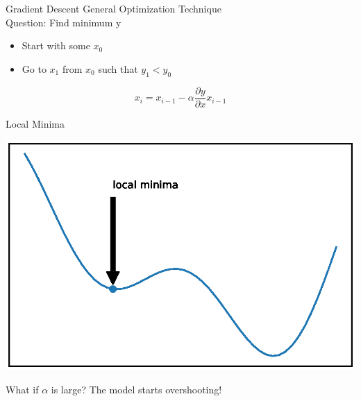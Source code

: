 \documentclass{beamer}
\begin{document}
\begin{frame}{Gradient Descent}
    General Optimization Technique\\
    Question: Find minimum y
    \begin{itemize}
        \item Start with some $x_{0}$
        \item Go to $x_{1}$ from $x_{0} $ such that $y_{1}< y_{0}$
    \end{itemize}
    
    \begin{equation*}
        x_{i} = x_{i-1} - \alpha\frac{\partial y }{\partial x} x_{i-1}
    \end{equation*}
    
\end{frame}

\begin{frame}{Local Minima}
      \begin{center}
       \includegraphics[totalheight=6cm]{gradient-descent/local-minima.eps}
   \end{center}
\end{frame}




\begin{frame}{What if $\alpha$ is large?}
    The model starts overshooting!
\end{frame}
\end{document}
